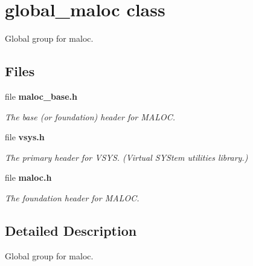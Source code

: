 \section{global\+\_\+maloc class}
\label{a00023}


Global group for maloc.  


\subsection*{Files}
\begin{DoxyCompactItemize}
\item 
file {\bf maloc\+\_\+base.\+h}
\begin{DoxyCompactList}\small\item\em The base (or foundation) header for M\+A\+L\+O\+C. \end{DoxyCompactList}\item 
file {\bf vsys.\+h}
\begin{DoxyCompactList}\small\item\em The primary header for V\+S\+Y\+S. (Virtual S\+Y\+Stem utilities library.) \end{DoxyCompactList}\item 
file {\bf maloc.\+h}
\begin{DoxyCompactList}\small\item\em The foundation header for M\+A\+L\+O\+C. \end{DoxyCompactList}\end{DoxyCompactItemize}


\subsection{Detailed Description}
Global group for maloc. 

